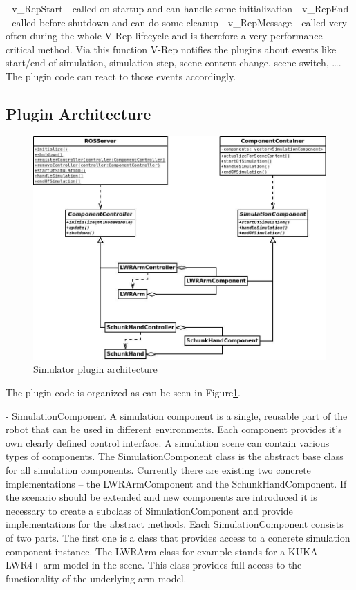 - v\_RepStart - called on startup and can handle some initialization
- v\_RepEnd - called before shutdown and can do some cleanup
- v\_RepMessage - called very often during the whole V-Rep lifecycle and is therefore a very
  performance critical method. Via this function V-Rep notifies the plugins about events like
  start/end of simulation, simulation step, scene content change, scene switch, \ldots.
  The plugin code can react to those events accordingly.


\subsection{Plugin Architecture}

\begin{figure}[ht]
	\centering
  	\includegraphics[width=1.0\textwidth]{images/SimulatorPluginUML.jpg}
	\caption{Simulator plugin architecture}
	\label{fig:plugin_uml}
\end{figure}
The plugin code is organized as can be seen in Figure\ref{fig:plugin_uml}.

- SimulationComponent
  A simulation component is a single, reusable part of the robot that can be used in different
  environments. Each component provides it's own clearly defined control interface. A simulation
  scene can contain various types of components. The SimulationComponent class is the abstract
  base class for all simulation components. Currently there are existing two concrete implementations
  -- the LWRArmComponent and the SchunkHandComponent. If the scenario should be extended and new
  components are introduced it is necessary to create a subclass of SimulationComponent and provide
  implementations for the abstract methods. Each SimulationComponent consists of two parts. The first 
  one is a class that provides access to a concrete simulation component instance. The LWRArm class
  for example stands for a KUKA LWR4+ arm model in the scene. This class provides full access to the
  functionality of the underlying arm model.
  
